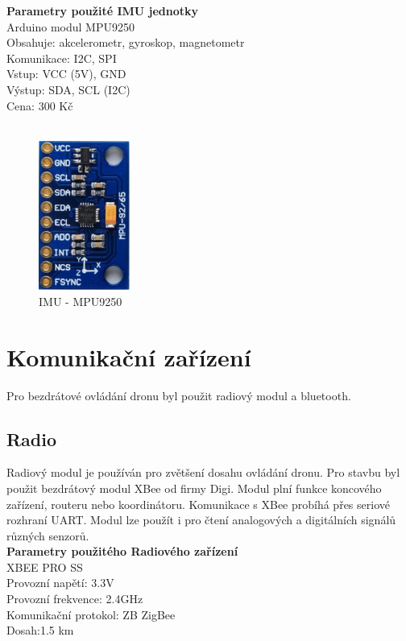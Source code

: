 
\textbf{Parametry použité IMU jednotky}\\
Arduino modul MPU9250\\
Obsahuje: akcelerometr, gyroskop, magnetometr\\
Komunikace: I2C, SPI\\
Vstup: VCC (5V), GND\\
Výstup: SDA, SCL (I2C)\\
Cena: 300 Kč\\
\cite{mpu9250}\\
\begin{figure}[H]
	\centering
	\includegraphics[width=3cm]{pictures/imu.jpg}
	\caption{IMU - MPU9250}
\end{figure}
 
\section{Komunikační zařízení} 
Pro bezdrátové ovládání dronu byl použit radiový modul a bluetooth.\\
\subsection{Radio} 
Radiový modul je používán pro zvětšení dosahu ovládání dronu. Pro stavbu byl použit bezdrátový modul XBee od firmy Digi. Modul plní funkce koncového zařízení, routeru nebo koordinátoru. Komunikace s XBee probíhá přes seriové rozhraní UART. Modul lze použít i pro čtení analogových a digitálních signálů různých senzorů.\\

\textbf{Parametry použitého Radiového zařízení}\\
XBEE PRO SS\\
Provozní napětí: 3.3V\\
Provozní frekvence: 2.4GHz\\
Komunikační protokol: ZB ZigBee\\
Dosah:1.5 km\\
\cite{xbee}\\

